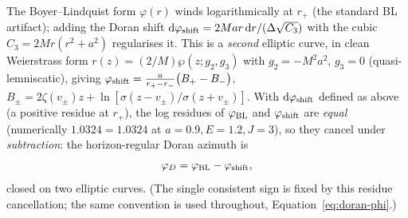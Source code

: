 \documentclass[12pt]{iopart}
\theoremstyle{plain}
\theoremstyle{definition}
\theoremstyle{remark}
\newcommand{\rp}{r_{+}}
\newcommand{\dd}{\mathrm{d}}
\begin{document}
The Boyer--Lindquist form
$\varphi(r)$ winds logarithmically at $\rp$ (the standard BL artifact); adding the
Doran shift $\dd\varphi_{\rm shift}=2Mar\,\dd r/(\Delta\sqrt{C_3})$ with the cubic
$C_3=2Mr(r^2+a^2)$ regularises it. This is a \emph{second} elliptic curve, in
clean Weierstrass form $r(z)=(2/M)\wp(z;g_2,g_3)$ with $g_2=-M^2a^2$, $g_3=0$
(quasi-lemniscatic), giving
$\varphi_{\rm shift}=\tfrac{a}{r_+-r_-}\big(B_+-B_-\big)$,
$B_\pm=2\zeta(v_\pm)z+\ln[\sigma(z-v_\pm)/\sigma(z+v_\pm)]$. With
$\dd\varphi_{\rm shift}$ defined as above (a positive residue at $\rp$), the
log residues of $\varphi_{\rm BL}$ and $\varphi_{\rm shift}$ are \emph{equal}
(numerically $1.0324=1.0324$ at $a=0.9,E=1.2,J=3$), so they cancel under
\emph{subtraction}: the horizon-regular Doran azimuth is
\begin{equation}
    \varphi_D=\varphi_{\rm BL}-\varphi_{\rm shift},
    \label{eq:doran-phi}
\end{equation}
closed on two elliptic curves. (The single consistent sign is fixed by this
residue cancellation; the same convention is used throughout,
Equation~\eqref{eq:doran-phi}.)
\end{document}
